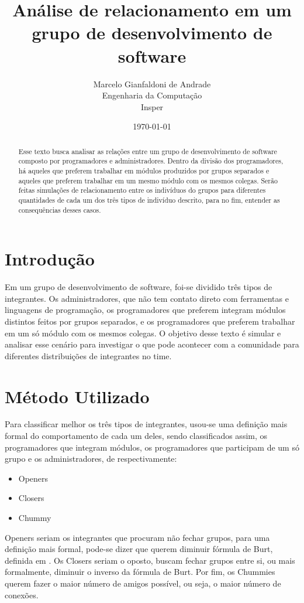 \documentclass[12pt]{article}
\title{Análise de relacionamento em um grupo de desenvolvimento de software}
\author{
	Marcelo Gianfaldoni de Andrade\\
	Engenharia da Computação\\
	Insper\\
}
\date{\today}
\begin{document}
\maketitle

\newpage
\tableofcontents
\newpage

\begin{abstract}
Esse texto busca analisar as relações entre um grupo de desenvolvimento de software composto por programadores e administradores. Dentro da divisão dos programadores, há aqueles que preferem trabalhar em módulos produzidos por grupos separados e aqueles que preferem trabalhar em um mesmo módulo com os mesmos colegas. Serão feitas simulações de relacionamento entre os indivíduos do grupos para diferentes quantidades de cada um dos três tipos de indivíduo descrito, para no fim, entender as consequências desses casos.
\end{abstract}

\section{Introdução}
Em um grupo de desenvolvimento de software, foi-se dividido três tipos de integrantes. Os administradores, que não tem contato direto com ferramentas e linguagens de programação, os programadores que preferem integram módulos distintos feitos por grupos separados, e os programadores que preferem trabalhar em um só módulo com os mesmos colegas. O objetivo desse texto é simular e analisar esse cenário para investigar o que pode acontecer com a comunidade para diferentes distribuições de integrantes no time.

\section{Método Utilizado}
Para classificar melhor os três tipos de integrantes, usou-se uma definição mais formal do comportamento de cada um deles, sendo classificados assim, os programadores que integram módulos, os programadores que participam de um só grupo e os administradores, de respectivamente:

\begin{itemize}
	\item Openers
	\item Closers
	\item Chummy
\end{itemize}


Openers seriam os integrantes que procuram não fechar grupos, para uma definição mais formal, pode-se dizer que querem diminuir fórmula de Burt, definida em \cite{burt}. Os Closers seriam o oposto, buscam fechar grupos entre si, ou mais formalmente, diminuir o inverso da fórmula de Burt. Por fim, os Chummies querem fazer o maior número de amigos possível, ou seja, o maior número de conexões.
\end{document}
